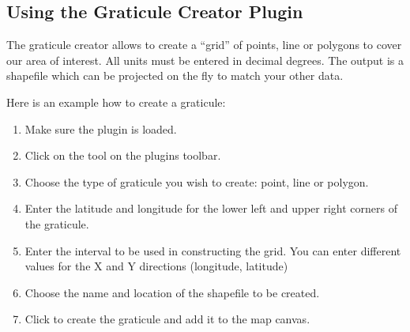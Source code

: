 \subsection{Using the Graticule Creator Plugin}

The graticule creator allows to create a ``grid'' of points, line or polygons to cover our area of interest.
All units must be entered in decimal degrees.
The output is a shapefile which can be projected on the fly to match your other data.


Here is an example how to create a graticule:

\begin{enumerate}
\item Make sure the plugin is loaded.
\item Click on the  tool on the plugins toolbar.
\item Choose the type of graticule you wish to create: point, line or polygon.
\item Enter the latitude and longitude for the lower left and upper right corners of the graticule.
\item Enter the interval to be used in constructing the grid. You can enter different values for the X and Y directions (longitude, latitude)
\item Choose the name and location of the shapefile to be created.
\item Click  to create the graticule and add it to the map canvas.
\end{enumerate} 


